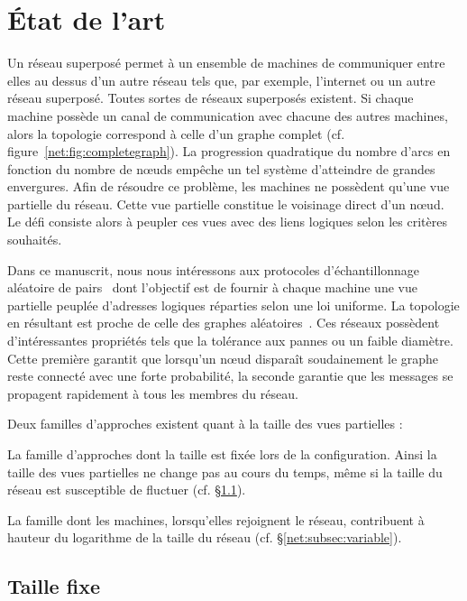 

\section{État de l'art}
\label{net:sec:stateoftheart}


Un réseau superposé permet à un ensemble de machines de communiquer entre elles
au dessus d'un autre réseau tels que, par exemple, l'internet ou un autre réseau
superposé.  Toutes sortes de réseaux superposés existent. Si chaque machine
possède un canal de communication avec chacune des autres machines, alors la
topologie correspond à celle d'un graphe complet
(cf. figure~\ref{net:fig:completegraph}). La progression quadratique du nombre
d'arcs en fonction du nombre de nœuds empêche un tel système d'atteindre de
grandes envergures. Afin de résoudre ce problème, les machines ne possèdent
qu'une vue partielle du réseau. Cette vue partielle constitue le voisinage
direct d'un nœud. Le défi consiste alors à peupler ces vues avec des liens
logiques selon les critères souhaités.


Dans ce manuscrit, nous nous intéressons aux protocoles d'échantillonnage
aléatoire de pairs~\cite{jelasity2007gossip} dont l'objectif est de fournir à
chaque machine une vue partielle peuplée d'adresses logiques réparties selon une
loi uniforme. La topologie en résultant est proche de celle des graphes
aléatoires~\cite{erdos1959random}. Ces réseaux possèdent d'intéressantes
propriétés tels que la tolérance aux pannes ou un faible diamètre. Cette
première garantit que lorsqu'un nœud disparaît soudainement le graphe reste
connecté avec une forte probabilité, la seconde garantie que les messages se
propagent rapidement à tous les membres du réseau.


Deux familles d'approches existent quant à la taille des vues partielles :
\begin{inparaenum}[(i)]
\item La famille d'approches dont la taille est fixée lors de la
  configuration. Ainsi la taille des vues partielles ne change pas au cours du
  temps, même si la taille du réseau est susceptible de fluctuer
  (cf. §\ref{net:subsec:fixed}).
\item La famille dont les machines, lorsqu'elles rejoignent le réseau,
  contribuent à hauteur du logarithme de la taille du réseau
  (cf. §\ref{net:subsec:variable}).
\end{inparaenum}

\subsection{Taille fixe}
\label{net:subsec:fixed}

